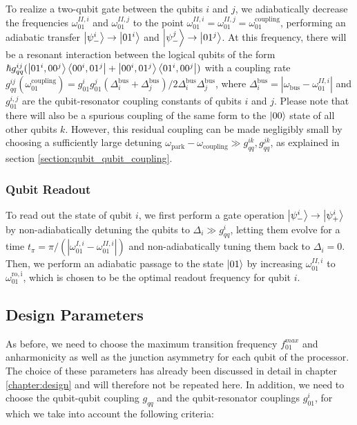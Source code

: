 To realize a two-qubit gate between the qubits $i$ and $j$, we adiabatically decrease the frequencies $\omega_{01}^{II,i}$ and $\omega_{01}^{II,j}$ to the point $\omega_{01}^{II,i}=\omega_{01}^{II,j}=\omega_{01}^{\mathrm{coupling}}$, performing an adiabatic transfer $\left| \psi_-^i \right>\to\left| 01^i \right>$ and $\left| \psi_-^j \right>\to\left| 01^j \right>$. At this frequency, there will be a resonant interaction between the logical qubits of the form $\hbar g_{qq}^{ij}(\left| 01^i,00^j \right>\left< 00^i,01^j \right|+\left| 00^i,01^j \right>\left< 01^i,00^j \right|)$ with a coupling rate $g_{qq}^{ij}(\omega_{01}^\mathrm{coupling})=g_{01}^i g_{01}^j (\Delta_i^\mathrm{bus}+\Delta_j^\mathrm{bus})/2\Delta_i^{\mathrm{bus}}\Delta_j^\mathrm{bus}$, where $\Delta_i^\mathrm{bus}=|\omega_\mathrm{bus}-\omega_{01}^{II,i}|$ and $g_{01}^{i,j}$ are the qubit-resonator coupling constants of qubits $i$ and $j$. Please note that there will also be a spurious coupling of the same form to the $\left| 00 \right>$ state of all other qubits $k$. However, this residual coupling can be made negligibly small by choosing a sufficiently large detuning $\omega_\mathrm{park}-\omega_\mathrm{coupling} \gg g_{qq}^{ik},g_{qq}^{jk}$, as explained in section \ref{section:qubit_qubit_coupling}.

\subsubsection{Qubit Readout}

To read out the state of qubit $i$, we first perform a gate operation $\left| \psi_-^i \right>\to\left| \psi_+^i \right>$ by non-adiabatically detuning the qubits to $\Delta_i\gg g_{qq}^i$, letting them evolve for a time $t_\pi=\pi/(|\omega_{01}^{I,i}-\omega_{01}^{II,i}|)$ and non-adiabatically tuning them back to $\Delta_i = 0$. Then, we perform an adiabatic passage to the state $\left| 01 \right>$ by increasing $\omega_{01}^{II,i}$ to $\omega_{01}^\mathrm{ro,i}$, which is chosen to be the optimal readout frequency for qubit $i$.

\subsection{Design Parameters}

As before, we need to choose the maximum transition frequency $f_{01}^{max}$ and anharmonicity as well as the junction asymmetry for each qubit of the processor. The choice of these parameters has already been discussed in detail in chapter \ref{chapter:design} and will therefore not be repeated here. In addition, we need to choose the qubit-qubit coupling $g_{qq}$ and the qubit-resonator couplings $g_{01}^i$, for which we take into account the following criteria:

